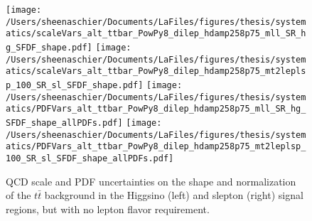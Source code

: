   \begin{figure}
  \centering 
   \texttt{[image: /Users/sheenaschier/Documents/LaFiles/figures/thesis/systematics/scaleVars\_alt\_ttbar\_PowPy8\_dilep\_hdamp258p75\_mll\_SR\_hg\_SFDF\_shape.pdf]}
  \texttt{[image: /Users/sheenaschier/Documents/LaFiles/figures/thesis/systematics/scaleVars\_alt\_ttbar\_PowPy8\_dilep\_hdamp258p75\_mt2leplsp\_100\_SR\_sl\_SFDF\_shape.pdf]}
  \texttt{[image: /Users/sheenaschier/Documents/LaFiles/figures/thesis/systematics/PDFVars\_alt\_ttbar\_PowPy8\_dilep\_hdamp258p75\_mll\_SR\_hg\_SFDF\_shape\_allPDFs.pdf]}
  \texttt{[image: /Users/sheenaschier/Documents/LaFiles/figures/thesis/systematics/PDFVars\_alt\_ttbar\_PowPy8\_dilep\_hdamp258p75\_mt2leplsp\_100\_SR\_sl\_SFDF\_shape\_allPDFs.pdf]}
\caption{QCD scale and PDF uncertainties on the shape and normalization of the $t\bar{t}$ background in the Higgsino (left) and slepton (right) signal regions, but with no lepton flavor requirement.}
\label{fig:theoryUncsttbar}
 \end{figure}
